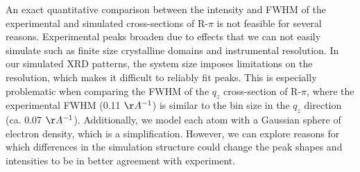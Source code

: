 \documentclass[journal=jpcbfk,manuscript=article]{achemso}
\begin{document}
  An exact quantitative comparison between the intensity and FWHM of the
  experimental and simulated cross-sections of R-$\pi$ is not feasible for
  several reasons. Experimental peaks broaden due to effects that we can not
  easily simulate such as finite size crystalline domains and instrumental %
  resolution.  In our simulated XRD patterns, the system size imposes limitations
  on the resolution, which makes it difficult to reliably fit peaks. This is
  especially problematic when comparing the FWHM of the $q_z$ cross-section of
  R-$\pi$, where the experimental FWHM (0.11 $\AA^{-1}$) is similar to the bin
  size in the $q_z$ direction (ca. 0.07 $\AA^{-1}$).  Additionally, we model each
  atom with a Gaussian sphere of electron density, which is a simplification.
  However, we can explore reasons for which differences in the simulation
  structure could change the peak shapes and intensities to be in better
  agreement with experiment.


   
\end{document}
